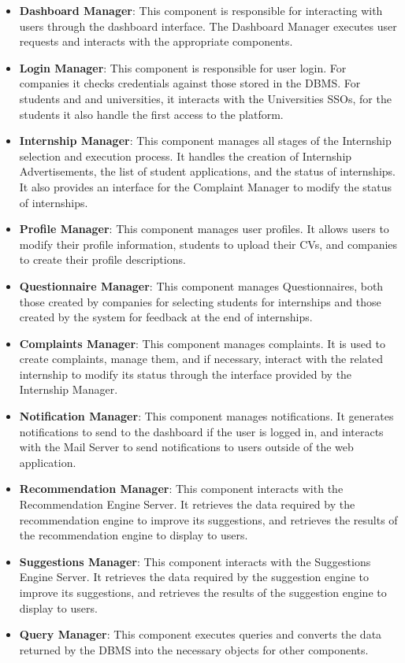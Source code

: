 \begin{itemize}
      \item \textbf{Dashboard Manager}: This component is responsible for interacting with users through the dashboard interface.
            The Dashboard Manager executes user requests and interacts with the appropriate components.
      \item \textbf{Login Manager}: This component is responsible for user login. For companies it checks credentials 
      against those stored in the DBMS. For students and and universities, it interacts with the Universities SSOs,
      for the students it also handle the first access to the platform.
      \item \textbf{Internship Manager}: This component manages all stages of the Internship selection and execution process.
            It handles the creation of Internship Advertisements, the list of student applications,
            and the status of internships. It also provides an interface for the Complaint Manager to modify the status of internships.
      \item \textbf{Profile Manager}: This component manages user profiles. It allows users to modify their profile information,
            students to upload their CVs, and companies to create their profile descriptions.
      \item \textbf{Questionnaire Manager}: This component manages Questionnaires, both those created by companies for selecting students for internships
            and those created by the system for feedback at the end of internships.
      \item \textbf{Complaints Manager}: This component manages complaints. It is used to create complaints, manage them, and if necessary,
            interact with the related internship to modify its status through the interface provided by the Internship Manager.
      \item \textbf{Notification Manager}: This component manages notifications. It generates notifications to send to the
            dashboard if the user is logged in, and interacts with the Mail Server to send notifications to users outside of the web application.
      \item \textbf{Recommendation Manager}: This component interacts with the Recommendation Engine Server. It retrieves the data
            required by the recommendation engine to improve its suggestions, and retrieves the results of the recommendation engine to display to users.
      \item \textbf{Suggestions Manager}: This component interacts with the Suggestions Engine Server. It retrieves the data
            required by the suggestion engine to improve its suggestions, and retrieves the results of the suggestion engine to display to users.
      \item \textbf{Query Manager}: This component executes queries and converts the data returned by the DBMS into the necessary objects for other components.
\end{itemize}

